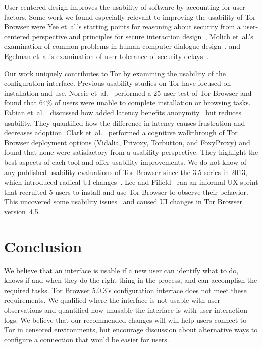 \documentclass[USenglish,oneside,twocolumn]{article}
\begin{document}
User-centered design improves the usability of software by accounting for user factors. 
Some work we found especially relevant to improving the usability of Tor Browser were
Yee et~al.'s starting points for reasoning about security from
a user-centered perspective and principles for secure interaction design~\cite{yee2002user},  
Molich et~al.'s examination of  common problems in human-computer dialogue design~\cite{molich1990improving}, and Egelman et~al.'s examination of user tolerance of security delays~\cite{egelmanplease}.

Our work uniquely contributes to Tor by examining the usability of the configuration interface.  
Previous usability studies on Tor have focused on installation and use. Norcie et~al.~\cite{norcie2012eliminating} performed a 25-user test of Tor Browser and found that 64\% of users were unable to complete installation or browsing tasks. Fabian et~al.~\cite{fabian2010privately} discussed how added latency benefits anonymity~\cite{dingledine2009performance} but reduces usability. They quantified how the difference in latency causes frustration and decreases adoption. Clark et~al.~\cite{clark2007usability} performed a cognitive walkthrough of Tor Browser deployment options (Vidalia, Privoxy, Torbutton, and FoxyProxy) and found that none were satisfactory from a usability perspective. They highlight the best aspects of each tool and offer usability improvements. We do not know of any published usability evaluations of
Tor Browser since the 3.5 series in 2013, which introduced radical UI changes~\cite{torbrowser-35}.
Lee and Fifield~\cite{uxsprint} ran an informal UX sprint that recruited 5 users to install and use Tor Browser to observe their behavior. This uncovered some usability issues~\cite{uxsprint2015-tickets} and caused UI changes in Tor Browser version~4.5.

\section{Conclusion} 
\label{sec:conclusion}
We believe that an interface is usable if a new user can identify what to do, knows if and when they do the right thing in the process, and can accomplish the required tasks. Tor Browser 5.0.3's configuration interface does not meet these requirements. We qualified where the interface is not usable with user observations and quantified how unusable the interface is with user interaction logs. We believe that our recommended changes will will help users connect to Tor in censored environments, but encourage discussion about alternative ways to configure a connection that would be easier for users. 
\end{document}
